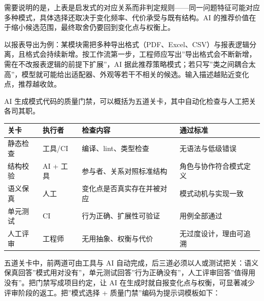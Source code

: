 \documentclass[12pt,a4paper,twoside,openany]{ctexbook}
\numberwithin{figure}{chapter}
\numberwithin{table}{chapter}
\newcounter{none}
\begin{document}
需要说明的是，上表是启发式的对应关系而非判定规则------同一问题特征可能对应多种模式，具体选择还取决于变化频率、代价承受与既有结构。AI
的推荐价值在于缩小候选范围，最终取舍仍要回到变化点与权衡上。

以报表导出为例：某模块需把多种导出格式（PDF、Excel、CSV）与报表逻辑分离，且格式会持续新增。按工作流第一步，工程师应写出''导出格式会不断新增，需在不改报表逻辑的前提下扩展''，AI
据此推荐策略模式；若只写''类之间耦合太高''，模型就可能给出适配器、外观等若干不相关的候选。输入描述越贴近变化点，推荐越收敛。

AI
生成模式代码的质量门禁，可以概括为五道关卡，其中自动化检查与人工把关各司其职。

{\def\LTcaptype{none} %
\begin{longtable}[]{@{}
  >{\raggedright\arraybackslash}p{}
  >{\raggedright\arraybackslash}p{}
  >{\raggedright\arraybackslash}p{}
  >{\raggedright\arraybackslash}p{}@{}}
\toprule\noalign{}
\begin{minipage}[b]{\linewidth}\raggedright
关卡
\end{minipage} & \begin{minipage}[b]{\linewidth}\raggedright
执行者
\end{minipage} & \begin{minipage}[b]{\linewidth}\raggedright
检查内容
\end{minipage} & \begin{minipage}[b]{\linewidth}\raggedright
通过标准
\end{minipage} \\
\midrule\noalign{}
\endhead
\bottomrule\noalign{}
\endlastfoot
静态检查 & 工具/CI & 编译、lint、类型检查 & 无语法与低级错误 \\
结构校验 & AI + 工具 & 参与者、关系对照标准结构 &
角色与协作符合模式定义 \\
语义保真 & 人工 & 变化点是否真实存在并被对应 & 模式动机与实现一致 \\
单元测试 & CI & 行为正确、扩展性可验证 & 用例全部通过 \\
人工评审 & 工程师 & 无用抽象、权衡与代价 & 无过度设计，理由可追溯 \\
\end{longtable}
}

五道关卡中，前两道可由工具与 AI
自动完成，后三道必须以人或测试把关：语义保真回答''模式用对没有''，单元测试回答''行为正确没有''，人工评审回答''值得用没有''。把门禁写成项目约定，让
AI 在生成时就自报变化点与权衡，可显著减少评审阶段的返工。把''模式选择 +
质量门禁''编码为提示词模板如下：
\end{document}
